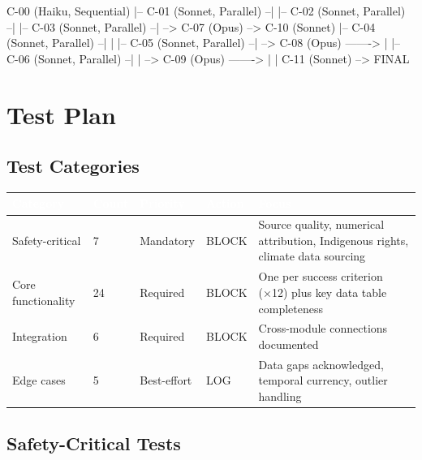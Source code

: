 \documentclass[11pt,letterpaper]{article}
\newcommand{\tableheader}[1]{\textbf{\sffamily\textcolor{white}{#1}}}
\begin{document}
\begin{asciibox}
  C-00 (Haiku, Sequential)
   |-- C-01 (Sonnet, Parallel) --|
   |-- C-02 (Sonnet, Parallel) --|
   |-- C-03 (Sonnet, Parallel) --|  --> C-07 (Opus) --> C-10 (Sonnet)
   |-- C-04 (Sonnet, Parallel) --|                            |
   |-- C-05 (Sonnet, Parallel) --|  --> C-08 (Opus) -------> |
   |-- C-06 (Sonnet, Parallel) --|                            |
                                     --> C-09 (Opus) -------> |
                                                               |
                                                        C-11 (Sonnet) --> FINAL
\end{asciibox}

\section{Test Plan}

\subsection{Test Categories}

\begin{center}
\begin{tabularx}{\textwidth}{L{3cm}C{1.5cm}L{2.5cm}L{2cm}X}
\toprule
{}
\tableheader{Category} & \tableheader{Count} & \tableheader{Priority} & \tableheader{Action} & \tableheader{Focus} \\
\midrule
Safety-critical & 7 & Mandatory & BLOCK & Source quality, numerical attribution, Indigenous rights, climate data sourcing \\
Core functionality & 24 & Required & BLOCK & One per success criterion (×12) plus key data table completeness \\
Integration & 6 & Required & BLOCK & Cross-module connections documented \\
Edge cases & 5 & Best-effort & LOG & Data gaps acknowledged, temporal currency, outlier handling \\
\bottomrule
\end{tabularx}
\end{center}

\subsection{Safety-Critical Tests}
\end{document}
